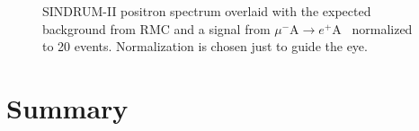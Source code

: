 \documentclass[12pt]{article}
\newcommand {\mumepconv}[1][A] {%
  \def\ArgI{{#1}}%
  \mumepconvRelay
}
\newcommand \mumepconvRelay[1][A]  {\mbox{$\mu^- \textrm{\ArgI} \rightarrow e^+ \textrm{#1}$}}
\begin{document}
\begin{figure}
\caption {
  \label{fig:ana_step2_sindrum_positron_best_fit_signal}
  SINDRUM-II positron spectrum overlaid with the expected background from RMC
  and a signal from \mumepconv\ normalized to 20 events. Normalization is chosen
  just to guide the eye.
}
\end{figure}


\newpage
\section{ Summary }
\end{document}
